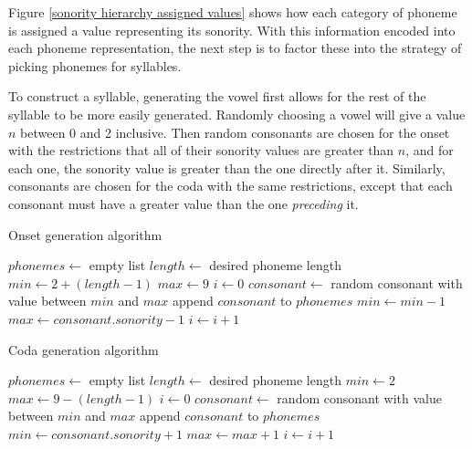 \documentclass{report}
\begin{document}
	Figure \ref{sonority hierarchy assigned values} shows how each category of phoneme is assigned a value representing its sonority. With this information encoded into each phoneme representation, the next step is to factor these into the strategy of picking phonemes for syllables.
	
	To construct a syllable, generating the vowel first allows for the rest of the syllable to be more easily generated. Randomly choosing a vowel will give a value $n$ between 0 and 2 inclusive. Then random consonants are chosen for the onset with the restrictions that all of their sonority values are greater than $n$, and for each one, the sonority value is greater than the one directly after it. Similarly, consonants are chosen for the coda with the same restrictions, except that each consonant must have a greater value than the one \textit{preceding} it. 
	
	\begin{algorithm}
		\caption{Onset generation algorithm}
		\label{onset generation algorithm}
		\begin{algorithmic}[1]
			\State $phonemes \gets$ empty list
			\State $length \gets $ desired phoneme length
			\State $min \gets 2 + (length - 1)$ 
			\State $max \gets 9$ 
			\State $i \gets 0$ 
				\State $consonant \gets $ random consonant with value between $min$ and $max$
				\State append $consonant$ to $phonemes$
				\State $min \gets min - 1$
				\State $max \gets consonant.sonority - 1$
				\State $i \gets i + 1$
			\EndWhile
		\end{algorithmic}
	\end{algorithm}

	\begin{algorithm}
		\caption{Coda generation algorithm}
		\label{coda generation algorithm}
		\begin{algorithmic}[1]
			\State $phonemes \gets$ empty list
			\State $length \gets $ desired phoneme length
			\State $min \gets 2$
			\State $max \gets 9 - (length - 1)$
			\State $i \gets 0$ \Comment{loop counter}
			\While{$i < length$}
				\State $consonant \gets $ random consonant with value between $min$ and $max$
				\State append $consonant$ to $phonemes$
				\State $min \gets consonant.sonority + 1$
				\State $max \gets max + 1$
				\State $i \gets i + 1$
			\EndWhile
		\end{algorithmic}
	\end{algorithm}
\end{document}
